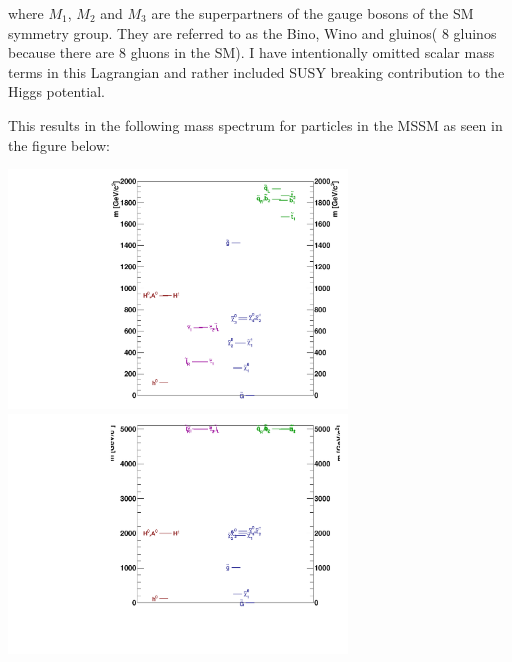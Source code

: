 where $M_{1}$, $M_{2}$ and $M_{3}$ are the superpartners of the gauge bosons of the SM symmetry group. They are referred to as the Bino, Wino and gluinos( 8 gluinos because there are 8 gluons in the SM). I have intentionally omitted  scalar mass terms in this Lagrangian and rather included SUSY breaking contribution to the Higgs potential.

This results in the following mass spectrum for particles in the MSSM as seen in the figure below:
\begin{center}\label{spectra}
\centering
\mbox{\includegraphics[height=2.5in]{THESISPLOTS/gmsb_Lambda180_CTau10000.pdf} \quad 
\includegraphics[height=2.5in]{THESISPLOTS/M3_1015_M1_255.pdf} }
\label{fig:spectra}
\end{center}

